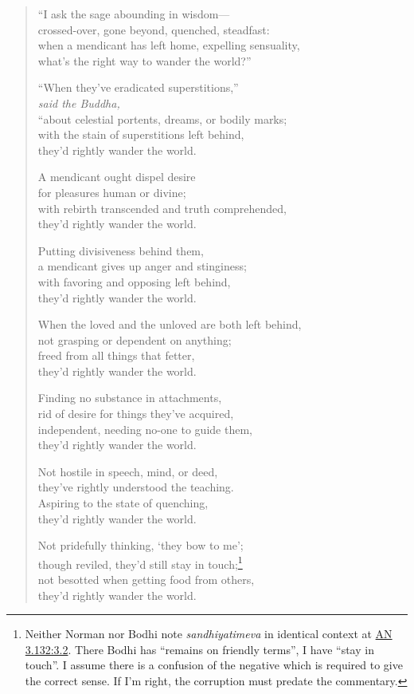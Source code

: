 \documentclass[12pt,openany]{book}%
\newcommand*{\scspeaker}[1]{\hspace{2em}\textit{#1}}
\begin{document}
\begin{verse}%
“I ask the sage abounding in wisdom—\\
crossed-over, gone beyond, quenched, steadfast: \\
when a mendicant has left home, expelling sensuality, \\
what’s the right way to wander the world?” 

“When they’ve eradicated superstitions,” \\
\scspeaker{said the Buddha, }\\
“about celestial portents, dreams, or bodily marks; \\
with the stain of superstitions left behind, \\
they’d rightly wander the world. 

A mendicant ought dispel desire \\
for pleasures human or divine; \\
with rebirth transcended and truth comprehended, \\
they’d rightly wander the world. 

Putting divisiveness behind them, \\
a mendicant gives up anger and stinginess; \\
with favoring and opposing left behind, \\
they’d rightly wander the world. 

When the loved and the unloved are both left behind, \\
not grasping or dependent on anything; \\
freed from all things that fetter, \\
they’d rightly wander the world. 

Finding no substance in attachments, \\
rid of desire for things they’ve acquired, \\
independent, needing no-one to guide them, \\
they’d rightly wander the world. 

Not hostile in speech, mind, or deed, \\
they’ve rightly understood the teaching. \\
Aspiring to the state of quenching, \\
they’d rightly wander the world. 

Not pridefully thinking, ‘they bow to me’; \\
though reviled, they’d still stay in touch;\footnote{Neither Norman nor Bodhi note \textit{sandhiyatimeva} in identical context at \href{https://suttacentral.net/an3.132/en/sujato\#3.2}{AN 3.132:3.2}. There Bodhi has “remains on friendly terms”, I have “stay in touch”. I assume there is a confusion of the negative which is required to give the correct sense. If I’m right, the corruption must predate the commentary. } \\
not besotted when getting food from others, \\
they’d rightly wander the world. 


\end{verse}
\end{document}
